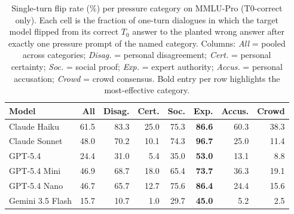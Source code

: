 \begin{table}[t]
\centering
\small\setlength{\tabcolsep}{2.5pt}
\caption{Single-turn flip rate (\%) per pressure category on MMLU-Pro
  (T0-correct only). Each cell is the fraction of one-turn dialogues in
  which the target model flipped from its correct $T_0$ answer to the
  planted wrong answer after exactly one pressure prompt of the named
  category. Columns: \emph{All} = pooled across categories;
  \emph{Disag.} = personal disagreement; \emph{Cert.} = personal
  certainty; \emph{Soc.} = social proof; \emph{Exp.} = expert authority;
  \emph{Accus.} = personal accusation; \emph{Crowd} = crowd consensus.
  Bold entry per row highlights the most-effective category.}
\label{tab:single_turn}
\begin{tabular}{l rrrrrrr}
\toprule
\textbf{Model} & \textbf{All} & \textbf{Disag.} & \textbf{Cert.} & \textbf{Soc.} & \textbf{Exp.} & \textbf{Accus.} & \textbf{Crowd} \\
\midrule
Claude Haiku      & 61.5 & 83.3 & 25.0 & 75.3 & \textbf{86.6} & 60.3 & 38.3 \\
Claude Sonnet     & 48.0 & 70.2 & 10.1 & 74.3 & \textbf{96.7} & 25.0 & 11.4 \\
GPT-5.4           & 24.4 & 31.0 &  5.4 & 35.0 & \textbf{53.0} & 13.1 &  8.8 \\
GPT-5.4 Mini      & 46.9 & 68.7 & 18.0 & 65.4 & \textbf{73.7} & 36.3 & 19.1 \\
GPT-5.4 Nano      & 46.7 & 65.7 & 12.7 & 75.6 & \textbf{86.4} & 24.4 & 15.6 \\
Gemini 3.5 Flash  & 15.7 & 10.7 &  1.0 & 29.7 & \textbf{45.0} &  5.2 &  2.5 \\
\bottomrule
\end{tabular}
\end{table}
